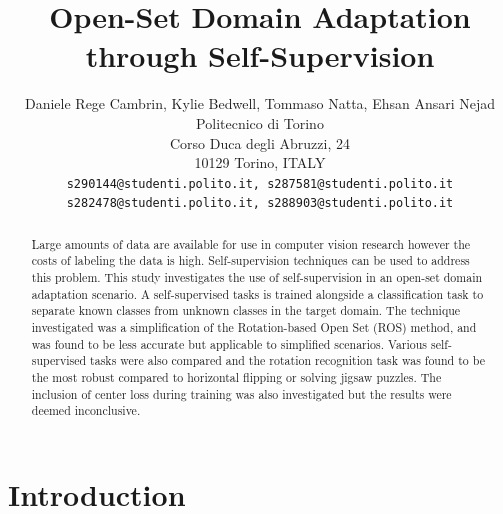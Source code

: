 \documentclass[10pt,twocolumn,letterpaper]{article}
\begin{document}
\title{Open-Set Domain Adaptation through Self-Supervision}

\author{Daniele Rege Cambrin, Kylie Bedwell, Tommaso Natta, Ehsan Ansari Nejad\\
Politecnico di Torino\\
Corso Duca degli Abruzzi, 24\\
10129 Torino, ITALY\\
{\tt\small s290144@studenti.polito.it, s287581@studenti.polito.it} \\
{\tt\small s282478@studenti.polito.it, s288903@studenti.polito.it}
}
\maketitle

\begin{abstract}
Large amounts of data are available for use in computer vision research however the costs of labeling the data is high. Self-supervision techniques can be used to address this problem. This study investigates the use of self-supervision in an open-set domain adaptation scenario. A self-supervised tasks is trained alongside a classification task to separate known classes from unknown classes in the target domain. The technique investigated was a simplification of the Rotation-based Open Set (ROS) method, and was found to be less accurate but applicable to simplified scenarios. Various self-supervised tasks were also compared and the rotation recognition task was found to be the most robust compared to horizontal flipping or solving jigsaw puzzles. The inclusion of center loss during training was also investigated but the results were deemed inconclusive.
\end{abstract}

\section{Introduction}
\label{sec:intro}
\end{document}
